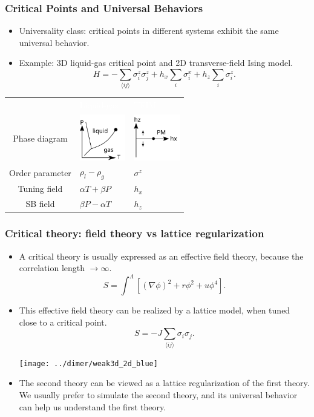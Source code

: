 \documentclass[xcolor=table, 10pt, aspectratio=43]{beamer}
\renewcommand{\arraystretch}{1.5}
\begin{document}
\begin{frame}
  \frametitle{Critical Points and Universal Behaviors}
  \begin{itemize}
  \item Universality class: critical points in different systems exhibit the same universal behavior.
  \item Example: 3D liquid-gas critical point and 2D transverse-field Ising model.
  \[H = -\sum_{\langle ij\rangle}\sigma_i^z\sigma_j^z+h_x\sum_i\sigma_i^x
  +h_z\sum_i\sigma_i^z.\]
\end{itemize}
  \begin{table}
    \centering
    \renewcommand{\arraystretch}{1.5}
    \begin{tabularx}{\columnwidth}{cxx}
      &\textcolor{white}{Liquid-gas}&\textcolor{white}{TFIM}\\
      Phase diagram & \includegraphics[width=2cm]{../eqmc/liquidgas} &\includegraphics[width=2cm]{../eqmc/tfim}\\
      Order parameter & $\rho_l-\rho_g$ & $\sigma^z$\\
      Tuning field & $\alpha T+\beta P$ & $h_x$\\
      SB field & $\beta P-\alpha T$ & $h_z$
    \end{tabularx}
  \end{table}
\end{frame}

\begin{frame}
	\frametitle{Critical theory: field theory vs lattice regularization}
	\begin{itemize}
		\item A critical theory is usually expressed as an effective field theory, because the correlation length $\rightarrow\infty$.
		\[S=\int^\Lambda \left[(\nabla\phi)^2+r\phi^2+u\phi^4\right].\]
		\item This effective field theory can be realized by a lattice model, when tuned close to a critical point.
		\[S=-J\sum_{\langle ij\rangle}\sigma_i\sigma_j.\]
		\begin{center}
			\texttt{[image: ../dimer/weak3d\_2d\_blue]}
		\end{center}
		\item The second theory can be viewed as a lattice regularization of the first theory.
		We usually prefer to simulate the second theory, and its universal behavior can help us understand the first theory.
	\end{itemize}
\end{frame}
\end{document}
